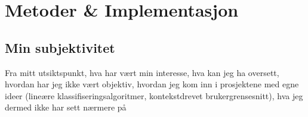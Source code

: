 \section[Metoder \& Implementasjon]{Metoder \& Implementasjon}
\subsection{Min subjektivitet}
{\color{red}Fra mitt utsiktspunkt, hva har vært min interesse, hva kan jeg ha oversett, hvordan har jeg ikke vært objektiv, hvordan jeg kom inn i prosjektene med egne ideer (lineære klassifiseringsalgoritmer, kontekstdrevet brukergrensesnitt), hva jeg dermed ikke har sett nærmere på}



